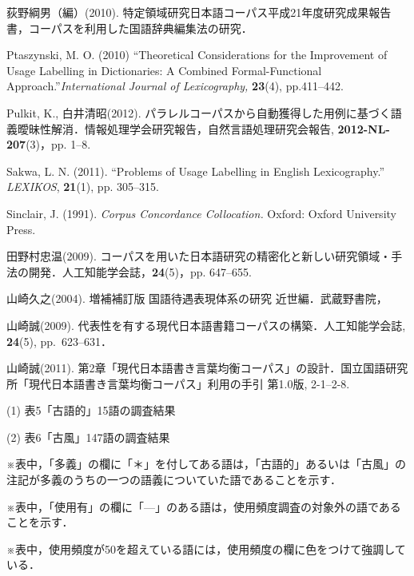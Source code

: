 \documentclass[japanese]{jnlp_1.4}
\begin{document}
\begin{thebibliography}{}
\item
荻野綱男（編）(2010). 
特定領域研究日本語コーパス平成21年度研究成果報告書，コーパスを利用した国語辞典編集法の研究．

\item
Ptaszynski, M. O. (2010) ``Theoretical Considerations for the Improvement of 
Usage Labelling in Dictionaries: A Combined Formal-Functional 
Approach.''\textit{International Journal of Lexicography, }\textbf{23}(4), pp.411--442.

\item
Pulkit, K., 白井清昭(2012). 
パラレルコーパスから自動獲得した用例に基づく語義曖昧性解消．情報処理学会研究報告，自然言語処理研究会報告, 
\textbf{2012-NL-207}(3)，pp. 1--8.

\item
Sakwa, L. N. (2011). ``Problems of Usage Labelling in English 
Lexicography.'' \textit{LEXIKOS}, \textbf{21}(1), pp. 305--315.

\item
Sinclair, J. (1991). \textit{Corpus Concordance Collocation.} Oxford: Oxford University Press.

\item
田野村忠温(2009). 
コーパスを用いた日本語研究の精密化と新しい研究領域・手法の開発．人工知能学会誌，\textbf{24}(5)，pp. 647--655.

\item
山崎久之(2004). 増補補訂版 国語待遇表現体系の研究 近世編．武蔵野書院，

\item
山崎誠(2009). 代表性を有する現代日本語書籍コーパスの構築．人工知能学会誌, 
\textbf{24}(5), pp.~623--631．

\item
山崎誠(2011). 
第2章「現代日本語書き言葉均衡コーパス」の設計．国立国語研究所「現代日本語書き言葉均衡コーパス」利用の手引 
第1.0版, 2-1--2-8.

\end{thebibliography}

\appendix

(1) 表5「古語的」15語の調査結果

(2) 表6「古風」147語の調査結果

※表中，「多義」の欄に「＊」を付してある語は，「古語的」あるいは「古風」の注記が多義のうちの一つの語義についていた語であることを示す．

※表中，「使用有」の欄に「—」のある語は，使用頻度調査の対象外の語であることを示す．

※表中，使用頻度が50を超えている語には，使用頻度の欄に色をつけて強調している．
\end{document}
